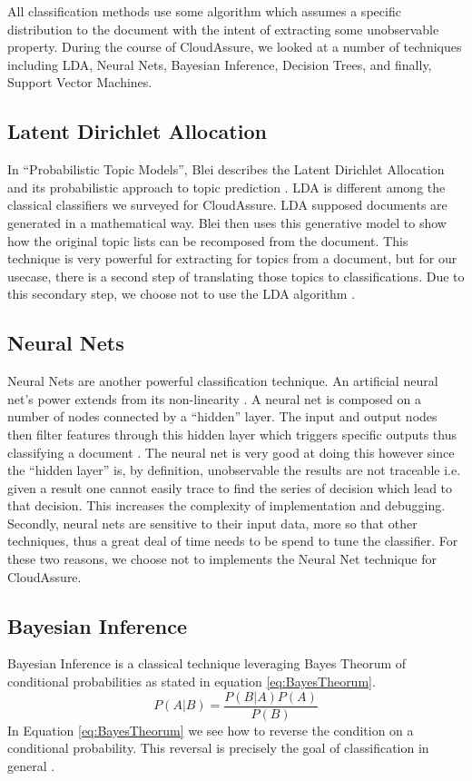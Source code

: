 All classification methods use some algorithm which assumes a specific
distribution to the document with the intent of extracting some unobservable
property. During the course of CloudAssure, we looked at a number of techniques
including \gls{LDA}, Neural Nets, Bayesian Inference, Decision Trees, and finally,
Support Vector Machines.

\subsection{Latent Dirichlet Allocation}
In ``Probabilistic Topic Models'', Blei describes the Latent Dirichlet
Allocation and its probabilistic approach to topic prediction
\autocite{Blei2012}. \gls{LDA} is different among the classical classifiers we
surveyed for CloudAssure. \gls{LDA} supposed documents are generated in
a mathematical way. Blei then uses this generative model to show how the original topic lists can be
recomposed from the document. This technique is very powerful for extracting for
topics from a document, but for our usecase, there is a second step of
translating those topics to classifications. Due to this secondary step, we
choose not to use the LDA algorithm \autocite{RadimRehurek2010}.

\subsection{Neural Nets}
Neural Nets are another powerful classification technique. An artificial neural
net's power
extends from its non-linearity \autocite{Zhang2000}. A neural net is composed on
a number of nodes connected by a ``hidden'' layer. The input and output nodes
then filter features through this hidden layer which triggers specific outputs
thus classifying a document \autocite{Merkl}. The neural net is very good at
doing this however since the ``hidden layer'' is, by definition, unobservable
the results are not traceable i.e. given a result one cannot easily trace to
find the series of decision which lead to that decision. This increases the
complexity of implementation and debugging. Secondly, neural nets are sensitive
to their input data, more so that other techniques, thus a great deal of time
needs to be spend to tune the classifier. For these two reasons, we choose not
to implements the Neural Net technique for CloudAssure. 

\subsection{Bayesian Inference}
Bayesian Inference is a classical technique leveraging Bayes Theorum of
conditional probabilities as stated in equation \ref{eq:BayesTheorum}.
\begin{equation}
    P(A|B) = \frac{P(B | A) P(A)}{P(B)}
    \label{eq:BayesTheorum}
\end{equation}
In Equation \ref{eq:BayesTheorum} we see how to reverse the condition on a conditional probability.
This reversal is precisely the goal of classification in general \autocite{Bishop2009}.

